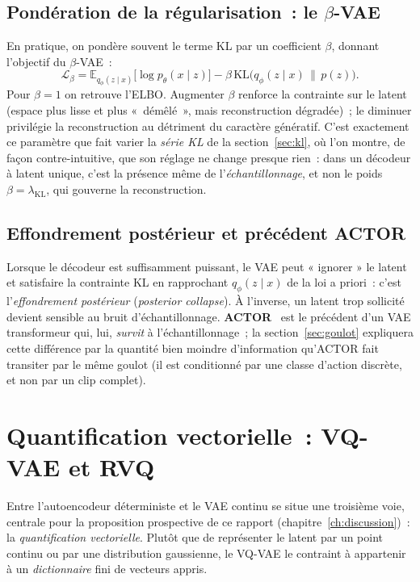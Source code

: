 \documentclass[12pt,a4paper,oneside]{report}
\theoremstyle{definition}
\theoremstyle{plain}
\newcommand{\lkl}{\ensuremath{\lambda_{\mathrm{KL}}}}
\newcommand{\E}{\mathbb{E}}
\newcommand{\KL}{\mathrm{KL}}
\begin{document}
\subsection{Pondération de la régularisation~: le \texorpdfstring{$\beta$}{beta}-VAE}

En pratique, on pondère souvent le terme KL par un coefficient $\beta$, donnant
l'objectif du $\beta$-VAE~:
\begin{equation}
\mathcal{L}_\beta = \E_{q_\phi(z\mid x)}\big[\log p_\theta(x\mid z)\big]
 - \beta\,\KL\!\big(q_\phi(z\mid x)\,\|\,p(z)\big).
\end{equation}
Pour $\beta=1$ on retrouve l'ELBO. Augmenter $\beta$ renforce la contrainte sur le
latent (espace plus lisse et plus «~démêlé~», mais reconstruction dégradée)~;
le diminuer privilégie la reconstruction au détriment du caractère génératif.
C'est exactement ce paramètre que fait varier la \emph{série KL} de la
section~\ref{sec:kl}, où l'on montre, de façon contre-intuitive, que son réglage ne
change presque rien~: dans un décodeur à latent unique, c'est la présence même de
l'\emph{échantillonnage}, et non le poids $\beta=\lkl$, qui gouverne la
reconstruction.

\subsection{Effondrement postérieur et précédent ACTOR}

Lorsque le décodeur est suffisamment puissant, le VAE peut « ignorer » le latent
et satisfaire la contrainte KL en rapprochant $q_\phi(z\mid x)$ de la loi a
priori~: c'est l'\emph{effondrement postérieur} (\emph{posterior collapse}). À
l'inverse, un latent trop sollicité devient sensible au bruit d'échantillonnage.
\textbf{ACTOR}~\cite{petrovich2021actor} est le précédent d'un VAE transformeur
qui, lui, \emph{survit} à l'échantillonnage~; la section~\ref{sec:goulot}
expliquera cette différence par la quantité bien moindre d'information qu'ACTOR
fait transiter par le même goulot (il est conditionné par une classe d'action
discrète, et non par un clip complet).

\section{Quantification vectorielle~: VQ-VAE et RVQ}
\label{sec:vq}

Entre l'autoencodeur déterministe et le VAE continu se situe une troisième voie,
centrale pour la proposition prospective de ce rapport (chapitre~\ref{ch:discussion})~:
la \emph{quantification vectorielle}. Plutôt que de représenter le latent par un
point continu ou par une distribution gaussienne, le VQ-VAE le contraint à
appartenir à un \emph{dictionnaire} fini de vecteurs appris.
\end{document}
